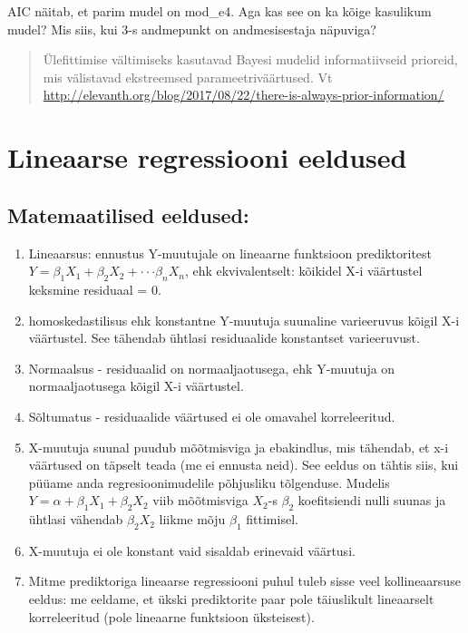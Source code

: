\documentclass[]{book}
\begin{document}
AIC näitab, et parim mudel on mod\_e4. Aga kas see on ka kõige kasulikum mudel? Mis siis, kui 3-s andmepunkt on andmesisestaja näpuviga?

\begin{quote}
Ülefittimise vältimiseks kasutavad Bayesi mudelid informatiivseid prioreid, mis välistavad ekstreemsed parameetriväärtused. Vt \url{http://elevanth.org/blog/2017/08/22/there-is-always-prior-information/}
\end{quote}

\hypertarget{lineaarse-regressiooni-eeldused}{%
\section{Lineaarse regressiooni eeldused}\label{lineaarse-regressiooni-eeldused}}

\hypertarget{matemaatilised-eeldused}{%
\subsection*{Matemaatilised eeldused:}\label{matemaatilised-eeldused}}

\begin{enumerate}
\def\labelenumi{\arabic{enumi}.}
\item
  Lineaarsus: ennustus Y-muutujale on lineaarne funktsioon prediktoritest \(Y = \beta_1X_1 + \beta_2X_2 +···\beta_nX_n\), ehk ekvivalentselt: kõikidel X-i väärtustel keksmine residuaal = 0.
\item
  homoskedastilisus ehk konstantne Y-muutuja suunaline varieeruvus kõigil X-i väärtustel. See tähendab ühtlasi residuaalide konstantset varieeruvust.
\item
  Normaalsus - residuaalid on normaaljaotusega, ehk Y-muutuja on normaaljaotusega kõigil X-i väärtustel.
\item
  Sõltumatus - residuaalide väärtused ei ole omavahel korreleeritud.
\item
  X-muutuja suunal puudub mõõtmisviga ja ebakindlus, mis tähendab, et x-i väärtused on täpselt teada (me ei ennusta neid). See eeldus on tähtis siis, kui püüame anda regresioonimudelile põhjusliku tõlgenduse. Mudelis \(Y = \alpha + \beta_1X_1 + \beta_2X_2\) viib mõõtmisviga \(X_2\)-s \(\beta_2\) koefitsiendi nulli suunas ja ühtlasi vähendab \(\beta_2X_2\) liikme mõju \(\beta_1\) fittimisel.
\item
  X-muutuja ei ole konstant vaid sisaldab erinevaid väärtusi.
\item
  Mitme prediktoriga lineaarse regressiooni puhul tuleb sisse veel kollineaarsuse eeldus: me eeldame, et ükski prediktorite paar pole täiuslikult lineaarselt korreleeritud (pole lineaarne funktsioon üksteisest).
\end{enumerate}
\end{document}
